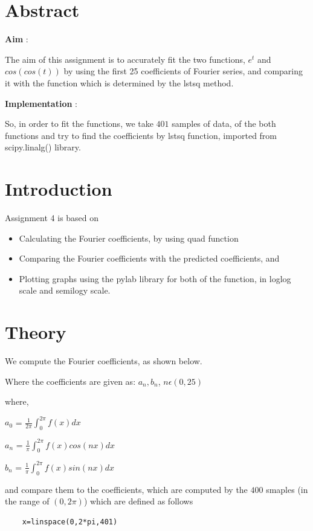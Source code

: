 \documentclass[10pt,english, openany]{book}
\begin{document}
\tableofcontents{}

\mainmatter

\chapter{Abstract}
	\large \textbf{Aim} : \par 
    The aim of this assignment is to accurately fit the two functions, $e^t$ and $cos(cos(t))$ by using the first 25 coefficients of Fourier series, and comparing it with the function which is determined by the lstsq method.\par

    \vspace{1cm}
   
    \large \textbf{Implementation} :  \par 
So, in order to fit the functions, we take $401$ samples of data, of the both functions and try to find the coefficients by lstsq function, imported from scipy.linalg() library.\par

\begingroup
\let\clearpage\relax
\chapter{Introduction}
Assignment 4 is based on
\begin{itemize}
\item Calculating the Fourier coefficients, by using quad function
\item Comparing the Fourier coefficients with the predicted coefficients, and
\item Plotting graphs using the pylab library for both of the function, in loglog scale and semilogy scale.
\end{itemize}
\endgroup
\chapter{Theory}
We compute the Fourier coefficients, as shown below.\par
Where the coefficients are given as: {$a_n,b_n$}, $n\epsilon(0,25)$\par
    where, \begin{center}
    $a_0$ = $\frac{1}{2\pi} \int_{0}^{2\pi} f(x)dx$\par
$a_n$ = $\frac{1}{\pi} \int_{0}^{2\pi} f(x)cos(nx)dx$\par
    $b_n$ = $\frac{1}{\pi} \int_{0}^{2\pi} f(x)sin(nx)dx$\par
        \end{center}
    \par
    and compare them to the coefficients, which are computed by the $400$ smaples (in the range of $(0,2\pi)$) which are defined as follows
    \begin{verbatim}
    x=linspace(0,2*pi,401)
    \end{verbatim}
\vspace{1cm}
\end{document}
